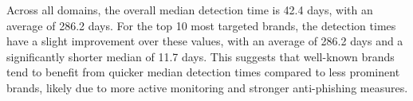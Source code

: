 Across all domains, the overall median detection time is 42.4 days, with an average of 286.2 days.
For the top 10 most targeted brands, the detection times have a slight improvement over these values, with an average of 286.2 days and a significantly shorter median of 11.7 days. This suggests that well-known brands tend to benefit from quicker median detection times compared to less prominent brands, likely due to more active monitoring and stronger anti-phishing measures.
% 
% 




